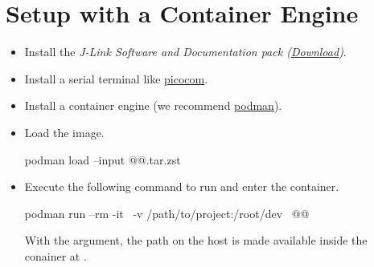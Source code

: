 \section{Setup with a Container Engine}

\begin{itemize}
  \item Install the \emph{J-Link Software and Documentation pack (\href{https://www.segger.com/downloads/jlink}{Download})}.
  \item Install a serial terminal like \href{https://formulae.brew.sh/formula/picocom}{picocom}.
  \item Install a container engine (we recommend \href{https://podman.io/docs/installation}{podman}).
  \item Load the image.
        \begin{monobox}
podman load --input @\imagename{}@.tar.zst
\end{monobox}
  \item Execute the following command to run and enter the container.
        \begin{monobox}
podman run --rm -it \
  -v /path/to/project:/root/dev \
  @\imagename{}@
\end{monobox}
    With the  argument, the  path on the host is made available inside the conainer at .
\end{itemize}
